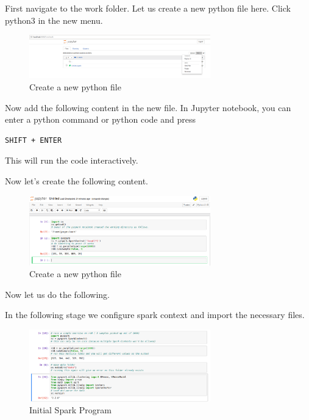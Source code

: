 First navigate to the work folder. Let us create a new python file here.
Click python3 in the new menu.

\begin{figure}[htbp]
\centering
\includegraphics[width=0.7\textwidth]{images/docker-spark-jup-2.png}
\caption{Create a new python file}
\end{figure}

Now add the following content in the new file. In Jupyter notebook, you
can enter a python command or python code and press

\begin{lstlisting}
SHIFT + ENTER
\end{lstlisting}

This will run the code interactively.

Now let's create the following content.

\begin{figure}[htbp]
\centering
\includegraphics[width=0.7\textwidth]{images/docker-spark-jup-3.png}
\caption{Create a new python file}
\end{figure}

Now let us do the following.

In the following stage we configure spark context and import the
necessary files.

\begin{figure}[htbp]
\centering
\includegraphics[width=0.7\textwidth]{images/docker-spark-tut-1.png}
\caption{Initial Spark Program}
\end{figure}

